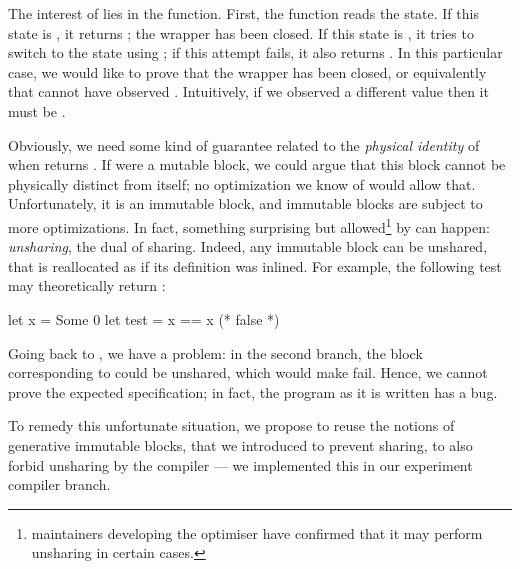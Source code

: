 The interest of  lies in the  function.
First, the function reads the state.
If this state is , it returns ; the wrapper has been closed.
If this state is , it tries to switch to the  state using ; if this attempt fails, it also returns .
In this particular case, we would like to prove that the wrapper has been closed, or equivalently that  cannot have observed .
Intuitively, if we observed a different value then it must be .

Obviously, we need some kind of guarantee related to the \emph{physical identity} of  when  returns .
If  were a mutable block, we could argue that this block cannot be physically distinct from itself; no optimization we know of would allow that.
Unfortunately, it is an immutable block, and immutable blocks are subject to more optimizations.
In fact, something surprising but allowed\footnote{\OCaml maintainers developing the \Flambda optimiser have confirmed that it may perform unsharing in certain cases.} by \OCaml can happen: \emph{unsharing}, the dual of sharing.
Indeed, any immutable block can be unshared, that is reallocated as if its definition was inlined.
For example, the following test may theoretically return :

\begin{ocamlcode}
let x = Some 0
let test = x == x (* false *)
\end{ocamlcode}

Going back to , we have a problem: in the second branch, the  block corresponding to  could be unshared, which would make  fail.
Hence, we cannot prove the expected specification; in fact, the program as it is written has a bug.

To remedy this unfortunate situation, we propose to reuse the notions of generative immutable blocks, that we introduced to prevent sharing, to also forbid unsharing by the \OCaml compiler --- we implemented this in our experiment compiler branch.

